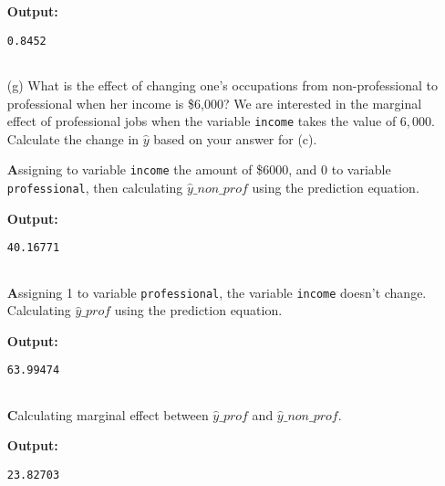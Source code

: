\documentclass[12pt,letterpaper]{article}
\begin{document}
\begin{enumerate}
	  
	\vspace{.25cm}
	
	\noindent \textbf{Output: }
	\begin{verbatim}
0.8452
		
	\end{verbatim}  
	\vspace{.25cm}
	
	
	\item [(g)]
	What is the effect of changing one's occupations from non-professional to professional when her income is \$6,000? We are interested in the marginal effect of professional jobs when the variable \texttt{income} takes the value of $6,000$. Calculate the change in $\hat{y}$ based on your answer for (c).	\vspace{0.5cm}
	
		\noindent \textbf Assigning to variable \texttt{income} the amount of \$6000, and 0 to variable \texttt{professional}, then calculating  $\hat{y}\_non\_prof$ using the prediction equation. 
\vspace{0.5cm}


  
\vspace{.25cm}

\noindent \textbf{Output: }
\begin{verbatim}
40.16771
	
\end{verbatim}  
\vspace{.25cm}

\noindent \textbf Assigning 1 to variable \texttt{professional}, the variable \texttt{income} doesn't change. Calculating  $\hat{y}\_prof$ using the prediction equation. 
\vspace{0.5cm}


  
\vspace{.25cm}

\noindent \textbf{Output: }
\begin{verbatim}
63.99474
	
\end{verbatim}  
\vspace{.25cm}

\noindent \textbf Calculating marginal effect between $\hat{y}\_prof$ and $\hat{y}\_non\_prof$.
\vspace{0.5cm}


  
\vspace{.25cm}

\noindent \textbf{Output: }
\begin{verbatim}
23.82703
	
\end{verbatim}  
\vspace{.25cm}

	
\end{enumerate}
\end{document}

